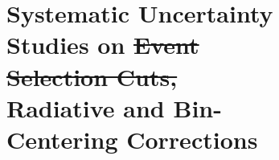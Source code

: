 \documentclass[aps, prl]{revtex4-2}  %
\providecommand{\DIFdeltex}[1]{{\protect\color{red}\sout{#1}}}                      %
\providecommand{\DIFdelbegin}{} %
\providecommand{\DIFdelend}{} %
\providecommand{\DIFdel}[1]{\texorpdfstring{\DIFdeltex{#1}}{}} %
\newcommand{\DIFscaledelfig}{0.5}
\newlength{\DIFdelgraphicswidth} %
\newlength{\DIFdelgraphicsheight} %
\newcommand{\DIFdelincludegraphics}[2][]{%
\sbox{\DIFdelgraphicsbox}{\DIFOincludegraphics[#1]{#2}}%
\settoboxwidth{\DIFdelgraphicswidth}{\DIFdelgraphicsbox} %
\settoboxtotalheight{\DIFdelgraphicsheight}{\DIFdelgraphicsbox} %
\scalebox{\DIFscaledelfig}{%
\parbox[b]{\DIFdelgraphicswidth}{\usebox{\DIFdelgraphicsbox}\\[-\baselineskip] \rule{\DIFdelgraphicswidth}{0em}}\llap{\resizebox{\DIFdelgraphicswidth}{\DIFdelgraphicsheight}{%
\setlength{\unitlength}{\DIFdelgraphicswidth}%
\begin{picture}(1,1)%
\thicklines\linethickness{2pt} %
{\color[rgb]{1,0,0}\put(0,0){\framebox(1,1){}}}%
{\color[rgb]{1,0,0}\put(0,0){\line( 1,1){1}}}%
{\color[rgb]{1,0,0}\put(0,1){\line(1,-1){1}}}%
\end{picture}%
}\hspace*{3pt}}} %
} %
\DeclareRobustCommand{\DIFdelbegin}{\DIFOdelbegin \let\includegraphics\DIFdelincludegraphics} %
\DeclareRobustCommand{\DIFdelend}{\DIFOaddend \let\includegraphics\DIFOincludegraphics} %
\begin{document}
\begin{figure}[!h]
\begin{figure}[!h]
\section{\large Systematic Uncertainty Studies on \DIFdelbegin \DIFdel{Event Selection Cuts, }\DIFdelend Radiative and Bin-Centering Corrections }

\end{figure}
\end{figure}
\end{document}
